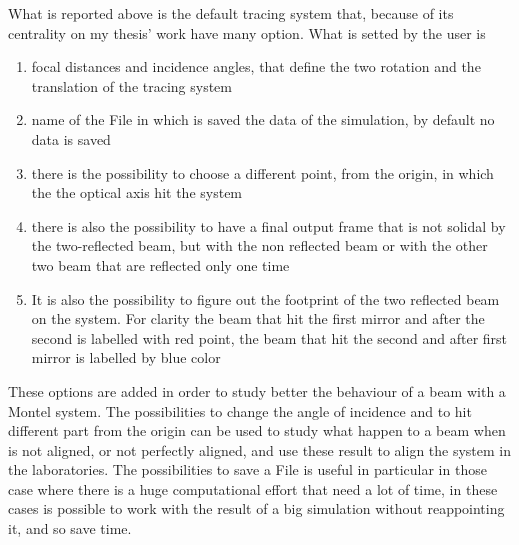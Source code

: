 \noindent What is reported above is the default tracing system that, because of its centrality on my thesis' work have many option. What is setted by the user is 
\begin{enumerate}
	\item focal distances and incidence angles, that define the two rotation and the translation of the tracing system
	\item name of the File in which is saved the data of the simulation, by default no data is saved
	\item there is the possibility to choose a different point, from the origin, in which the the optical axis hit the system
	\item there is also the possibility to have a final output frame that is not solidal by the two-reflected beam, but with the non reflected beam or with the other two beam that are reflected only one time
	\item It is also the possibility to figure out the footprint of the two reflected beam on the system. For clarity the beam that hit the first mirror and after the second is labelled with red point, the beam that hit the second and after first mirror is labelled by blue color
\end{enumerate}

\noindent These options are added in order to study better the behaviour of a beam with a Montel system. The possibilities to change the angle of incidence and to hit different part from the origin can be used to study what happen to a beam when is not aligned, or not perfectly aligned, and use these result to align the system in the laboratories. The possibilities to save a File is useful in particular in those case where there is a huge computational effort that need a lot of time, in these cases is possible to work with the result of a big simulation without reappointing it, and so save time.